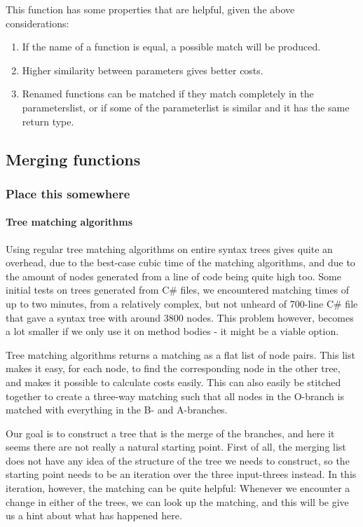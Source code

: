 \documentclass[11pt]{article}
\begin{document}
This function has some properties that are helpful, given the above considerations:

\begin{enumerate}
\item If the name of a function is equal, a possible match will be produced.
\item Higher similarity between parameters gives better costs.
\item Renamed functions can be matched if they match completely in the parameterslist, or if some of the parameterlist is similar and it has the same return type.
\end{enumerate}
\subsection{Merging functions}

\subsubsection{Place this somewhere}
\paragraph{Tree matching algorithms} Using regular tree matching algorithms on entire syntax trees gives quite an overhead, due to the best-case cubic time of the matching algorithms, and due to the amount of nodes generated from a line of code being quite high too. Some initial tests on trees generated from C\# files, we encountered matching times of up to two minutes, from a relatively complex, but not unheard of 700-line C\# file that gave a syntax tree with around 3800 nodes. This problem however, becomes a lot smaller if we only use it on method bodies - it might be a viable option.

Tree matching algorithms returns a matching as a flat list of node pairs. This list makes it easy, for each node, to find the corresponding node in the other tree, and makes it possible to calculate costs easily. This can also easily be stitched together to create a three-way matching such that all nodes in the O-branch is matched with everything in the B- and A-branches.

Our goal is to construct a tree that is the merge of the branches, and here it seems there are not really a natural starting point. First of all, the merging list does not have any idea of the structure of the tree we needs to construct, so the starting point needs to be an iteration over the three input-threes instead. In this iteration, however, the matching can be quite helpful: Whenever we encounter a change in either of the trees, we can look up the matching, and this will be give us a hint about what has happened here.
\end{document}
